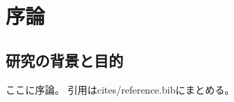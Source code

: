 \documentclass[a4paper,10pt, uplatex, report, openany]{jsbook}
\begin{document}
\setcounter{section}{0}
\chapter{序論}
\section{研究の背景と目的}
ここに序論。
引用\cite{Sample}はcites/reference.bibにまとめる。
\end{document}
